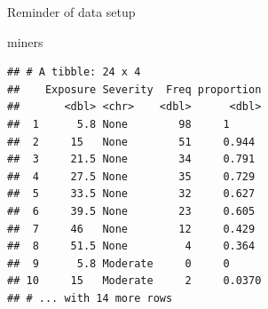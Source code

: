 \documentclass[
  ignorenonframetext,
]{beamer}
\newenvironment{Shaded}{\begin{snugshade}}{\end{snugshade}}
\newcommand{\NormalTok}[1]{#1}
\begin{document}
\begin{frame}[fragile]{Reminder of data setup}
\protect\hypertarget{reminder-of-data-setup}{}

\footnotesize

\begin{Shaded}
\begin{Highlighting}[]
\NormalTok{miners}
\end{Highlighting}
\end{Shaded}

\begin{verbatim}
## # A tibble: 24 x 4
##    Exposure Severity  Freq proportion
##       <dbl> <chr>    <dbl>      <dbl>
##  1      5.8 None        98     1     
##  2     15   None        51     0.944 
##  3     21.5 None        34     0.791 
##  4     27.5 None        35     0.729 
##  5     33.5 None        32     0.627 
##  6     39.5 None        23     0.605 
##  7     46   None        12     0.429 
##  8     51.5 None         4     0.364 
##  9      5.8 Moderate     0     0     
## 10     15   Moderate     2     0.0370
## # ... with 14 more rows
\end{verbatim}

\normalsize

\end{frame}
\end{document}
